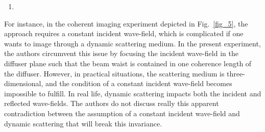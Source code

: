 \documentclass[12pt]{article}
\newenvironment{solved_reviewercomment}
    {\begin{tcolorbox}[width=\linewidth,colback=gray!5,colframe=solved_commentcolor!50,title=Reviewer Comment,left=5pt,right=5pt]}
    {\end{tcolorbox}}
\begin{document}
\begin{enumerate}[label=\arabic*.]
\item \leavevmode
\end{enumerate}
\vspace{-1em}
\begin{solved_reviewercomment}
    For instance, in the coherent imaging experiment depicted in Fig.~\ref{fig_5}, the approach requires a constant incident wave-field, which is complicated if one wants to image through a dynamic scattering medium. In the present experiment, the authors circumvent this issue by focusing the incident wave-field in the diffuser plane such that the beam waist is contained in one coherence length of the diffuser. However, in practical situations, the scattering medium is three-dimensional, and the condition of a constant incident wave-field becomes impossible to fulfill. In real life, dynamic scattering impacts both the incident and reflected wave-fields. The authors do not discuss really this apparent contradiction between the assumption of a constant incident wave-field and dynamic scattering that will break this invariance.
\end{solved_reviewercomment}
\end{document}
